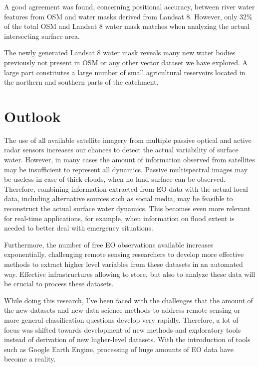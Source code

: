 A good agreement was found, concerning positional accuracy, between river water features from OSM and water masks derived from Landsat 8. However, only 32\% of the total OSM and Landsat 8 water mask matches when analyzing the actual intersecting surface area.

The newly generated Landsat 8 water mask reveals many new water bodies previously not present in OSM or any other vector dataset we have explored. A large part constitutes a large number of small agricultural reservoirs located in the northern and southern parts of the catchment.

\section{Outlook}

The use of all available satellite imagery from multiple passive optical and active radar sensors increases our chances to detect the actual variability of surface water. However, in many cases the amount of information observed from satellites may be insufficient to represent all dynamics. Passive multispectral images may be useless in case of thick clouds, when no land surface can be observed. Therefore, combining information extracted from \gls{EO} data with the actual local data, including alternative sources such as social media, may be feasible to reconstruct the actual surface water dynamics. This becomes even more relevant for real-time applications, for example, when information on flood extent is needed to better deal with emergency situations.

Furthermore, the number of free \gls{EO} observations available increases exponentially, challenging remote sensing researchers to develop more effective methods to extract higher level variables from these datasets in an automated way. Effective infrastructures allowing to store, but also to analyze these data will be crucial to process these datasets.

While doing this research, I've been faced with the challenges that the amount of the new datasets and new data science methods to address remote sensing or more general classification questions develop very rapidly. Therefore, a lot of focus was shifted towards development of new methods and exploratory tools instead of derivation of new higher-level datasets. With the introduction of tools such as Google Earth Engine, processing of huge amounts of \gls{EO} data have become a reality. 

